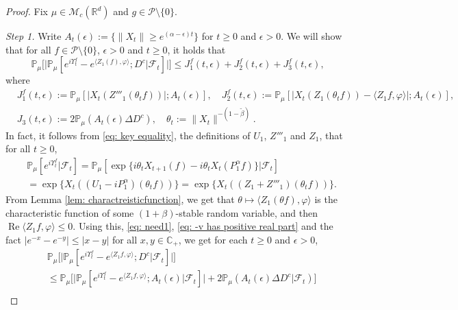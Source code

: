 \documentclass[EJP]{ejpecp} %
\begin{document}
\begin{proof}
	Fix  $\mu \in \mathcal M_c(\mathbb R^d)$ and $g \in \mathcal P\setminus \{0\}$.

	\emph{Step 1.} Write $ A_t(\epsilon) :=\{ \|X_t\| \geq e^{(\alpha - \epsilon)t} \} $ for $t\geq 0$ and $\epsilon > 0$.
	We will show that for all $f\in \mathcal P \setminus \{0\}$, $\epsilon > 0$ and $t\geq 0$, it holds that
\[
   	\mathbb P_\mu \Big[ \big| \mathbb P_\mu [e^{i\Upsilon^f_t} - e^{\langle Z_1(f), \varphi\rangle}; D^c | \mathscr F_t ]\big| \Big]
   	\leq J^f_1(t,\epsilon)+J^f_2(t,\epsilon)+J^f_3(t,\epsilon),
\]
	where
\begin{align}
\label{eq: Def of Ji}
	& J^f_1(t,\epsilon):= \mathbb{P}_{\mu} [ | X_t(Z'''_1(\theta_t f)) |; A_t(\epsilon) ], \quad
	J^f_2(t,\epsilon):= \mathbb{P}_{\mu}[|X_t( Z_1(\theta_t f))-\langle Z_1f, \varphi\rangle |; A_t(\epsilon)],
	\\ & J_3(t,\epsilon):=2\mathbb{P}_{\mu}(A_t (\epsilon)\Delta D^c), \quad
	\theta_t := \|X_t\|^{-(1 - \tilde \beta)}.
\end{align}
	In fact, it follows from \eqref{eq: key equality}, the definitions of $U_1$, $Z'''_1$ and $Z_1$, that for all $t\geq 0$,
\begin{align}
\label{eq: need1}
	& \mathbb{P}_{\mu}[e^{i\Upsilon^f_t}|\mathscr{F}_t]
    = \mathbb{P}_{\mu}[\exp\{i\theta_t X_{t+1} (f) - i \theta_t X_t(P_1^\alpha f)\} |\mathscr{F}_{t}] \\
	& = \exp\{X_t((U_1 - iP^\alpha_1 ) (\theta_t f))\}
    = \exp\{X_t((Z_1 + Z'''_1) (\theta_t f))\}.
\end{align}
	From Lemma \ref{lem: charactreisticfunction}, we  get that $\theta\mapsto \langle Z_1(\theta f),\varphi\rangle$ is the characteristic function of some $(1+\beta)$-stable random variable, and then  $\operatorname{Re} \langle Z_1f, \varphi\rangle \leq 0$.
	Using this, \eqref{eq: need1}, \eqref{eq: -v has positive real part} and the fact $|e^{-x} - e^{-y}| \leq |x-y|$ for all $x,y \in \mathbb C_+$, we get for each $t\geq 0$ and $\epsilon> 0$,
\begin{align}
\label{eq: inequality that will used later}
	& \mathbb{P}_\mu \Big[ \big|  \mathbb{P}_\mu [ e^{i\Upsilon^f_t} - e^{\langle Z_1f,\varphi \rangle} ; D^c | \mathscr F_{t}]   \big|\Big]  \\
  	& \leq \mathbb{P}_\mu   \Big[ \big|    \mathbb{P}_\mu [ e^{i \Upsilon^f_t }-e^{\langle Z_1f, \varphi\rangle}; A_{t}(\epsilon) | \mathscr F_{t}] \big|  + 2\mathbb P_\mu ( A_{t}(\epsilon) \Delta D^c | \mathscr F_{t}) \Big] \\

\end{align}
\end{proof}
\end{document}

